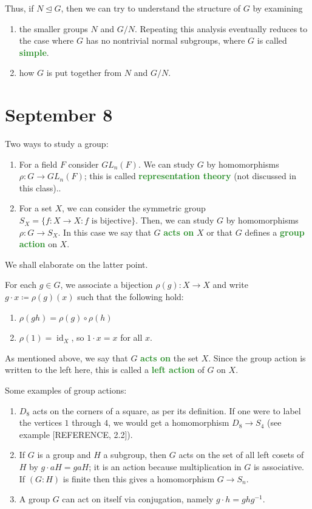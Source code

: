 \documentclass[11pt]{scrartcl}
\providecommand{\normaleq}{\trianglelefteq}
\providecommand{\ii}{\item}
\providecommand{\inv}{^{-1}}
\providecommand{\vocab}[1]{{\textbf{\textcolor{ForestGreen}{#1}}}}
\begin{document}
Thus, if $N\normaleq G$, then we can try to understand
the structure of $G$ by examining
\begin{enumerate}[(1)]
    \ii the smaller groups $N$ and $G/N$.
    Repeating this analysis eventually reduces to the case where
    $G$ has no nontrivial normal subgroups, where $G$ is called \vocab{simple}.
    \ii how $G$ is put together from $N$ and $G/N$.
\end{enumerate}

\section{September 8}\label{sec:sep08}

Two ways to study a group:
\begin{enumerate}[(1)]
    \ii For a field $F$ consider $GL_n(F)$.
    We can study $G$ by homomorphisms $\rho\colon G\to GL_n(F)$;
    this is called \vocab{representation theory}
    (not discussed in this class)..
    \ii For a set $X$, we can consider the symmetric group
    $S_X = \{f\colon X\to X : f\text{ is bijective}\}$.
    Then, we can study $G$ by homomorphisms $\rho\colon G\to S_X$.
    In this case we say that $G$ \vocab{acts on} $X$
    or that $G$ defines a \vocab{group action} on $X$.
\end{enumerate}

We shall elaborate on the latter point.
\begin{definition}
    \label{def:group-action}
    For each $g\in G$, we associate a bijection $\rho(g)\colon X\to X$
    and write $g\cdot x \coloneq \rho(g)(x)$ such that the following hold:
    \begin{enumerate}[(1)]
	\ii $\rho(gh) = \rho(g)\circ \rho(h)$
	\ii $\rho(1) = \operatorname{id}_X$, so $1\cdot x = x$ for all $x$.
    \end{enumerate}
    As mentioned above, we say that $G$ \vocab{acts on} the set $X$.
    Since the group action is written to the left here,
    this is called a \vocab{left action} of $G$ on $X$.
\end{definition}

\begin{example}
    Some examples of group actions:
    \begin{enumerate}[(1)]
	\ii $D_8$ acts on the corners of a square,
	as per its definition. If one were to label the vertices
	$1$ through $4$, we would get a homomorphism $D_8\to S_4$
	(see example [REFERENCE, 2.2]).
	\ii If $G$ is a group and $H$ a subgroup,
	then $G$ acts on the set of all left cosets of $H$
	by $g\cdot aH = gaH$; it is an action because
	multiplication in $G$ is associative.
	If $(G:H)$ is finite then this gives a homomorphism
	$G\to S_n$.
	\ii A group $G$ can act on itself via conjugation, namely
	$g\cdot h = ghg\inv$.
    \end{enumerate}
\end{example}
\end{document}
